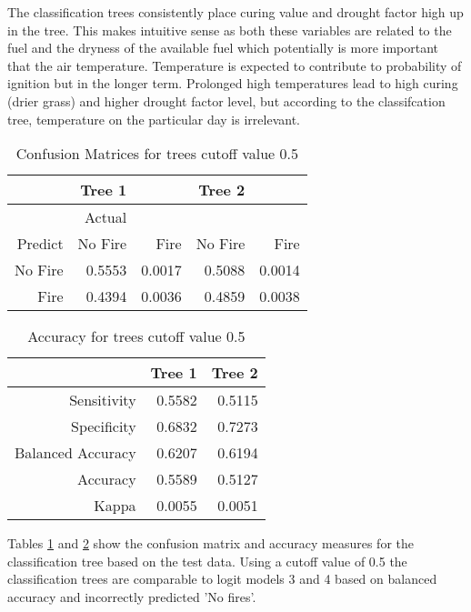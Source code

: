 \documentclass{article}
\begin{document}
The classification trees consistently place  curing value and drought factor high up in the tree. This makes intuitive sense as both these variables are related to the fuel and the dryness of the available fuel which potentially is more important that the air temperature. Temperature is expected to contribute to probability of ignition but in the longer term. Prolonged high temperatures lead to high curing (drier grass) and higher drought factor level, but according to the classifcation tree, temperature on the particular day is irrelevant. 

\begin{table}[ht]
	\centering
	\begin{tabular}{r|rr|rr}
		\hline
		  & Tree 1 &  & Tree 2 & \\ 
		\hline
		& Actual   &  &  &   \\ 
		Predict  & No Fire & Fire & No Fire & Fire\\ 
		\hline
No Fire  & 0.5553 & 0.0017 & 0.5088 & 0.0014 \\ 
Fire  & 0.4394 & 0.0036 & 0.4859 & 0.0038 \\ 
		\hline
	\end{tabular}
	\caption{Confusion Matrices for trees cutoff value 0.5}
	\label{table:tcm2}
\end{table}


\begin{table}[H]
	\centering
	\begin{tabular}{rrr}
		\hline
		 & Tree 1 & Tree 2 \\ 
		\hline
		Sensitivity  & 0.5582 & 0.5115 \\ 
		Specificity & 0.6832 & 0.7273 \\  
		Balanced Accuracy  & 0.6207 & 0.6194 \\ 
		Accuracy  & 0.5589 & 0.5127 \\ 
		Kappa & 0.0055 & 0.0051 \\ 
		\hline
	\end{tabular}
	\caption{Accuracy for trees cutoff value 0.5}
	\label{table:tacc2}
\end{table}

Tables \ref{table:tcm2} and \ref{table:tacc2} show the confusion matrix and accuracy measures for the classification tree based on the test data. Using a cutoff value of 0.5 the classification trees are comparable to logit models 3 and 4 based on balanced accuracy and incorrectly predicted 'No fires'. 
\end{document}
